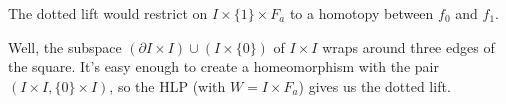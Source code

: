 The dotted lift would restrict on $I\times\{1\}\times F_a$ 
to a homotopy between $f_0$ and $f_1$. 

%
%

Well, the subspace $(\partial I\times I)\cup(I\times\{0\})$ of $I\times I$
wraps around three edges of the square. It's easy enough to create a 
homeomorphism with the pair $(I\times I,\{0\}\times I)$, so the HLP (with 
$W=I\times F_a$) gives us the dotted lift.


